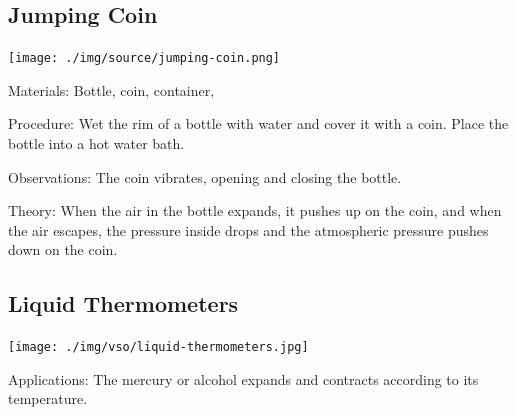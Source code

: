 \begin{multicols}{2}
\subsection{Jumping Coin}

\begin{center}
\texttt{[image: ./img/source/jumping-coin.png]}
\end{center}

\begin{description*}
\item[Materials:]{Bottle, coin, container, }
\item[Procedure:]{Wet the rim of a bottle with water and cover it with a coin. Place the bottle into a hot water bath.}
\item[Observations:]{The coin vibrates, opening and closing the bottle.}
\item[Theory:]{When the air in the bottle expands, it pushes up on the coin, and when the air escapes, the pressure inside drops and the atmospheric pressure pushes down on the coin.}
\end{description*}

\subsection{Liquid Thermometers}

\begin{center}
\texttt{[image: ./img/vso/liquid-thermometers.jpg]}
\end{center}

\begin{description*}
\item[Applications:]{The mercury or alcohol expands and contracts according to its temperature.}
\end{description*}


\end{multicols}

